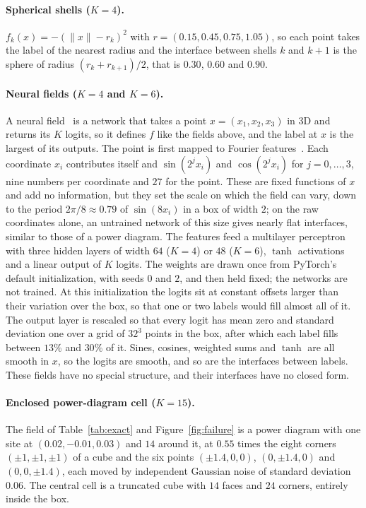 \documentclass[11pt]{article}
\theoremstyle{definition}
\begin{document}
\paragraph{Spherical shells ($K=4$).} $f_k(x) = -(\lVert x\rVert - r_k)^2$ with
$r = (0.15, 0.45, 0.75, 1.05)$, so each point takes the label of the nearest
radius and the interface between shells $k$ and $k+1$ is the sphere of radius
$(r_k + r_{k+1})/2$, that is $0.30$, $0.60$ and $0.90$.

\paragraph{Neural fields ($K=4$ and $K=6$).} A neural
field~\cite{xie2022} is a network that
takes a point ${x = (x_1, x_2, x_3)}$ in 3D and returns its $K$ logits, so it defines $f$ like the
fields above, and the label at $x$ is the largest of its outputs. The point
is first mapped to Fourier features~\cite{tancik2020}. Each coordinate $x_i$ contributes itself
and $\sin(2^j x_i)$ and $\cos(2^j x_i)$ for $j = 0,\dots,3$, nine numbers per
coordinate and $27$ for the point. These are fixed functions of $x$ and add
no information, but they set the scale on which the field can vary, down to
the period $2\pi/8 \approx 0.79$ of $\sin(8 x_i)$ in a box of width $2$; on
the raw coordinates alone, an untrained network of this size gives nearly flat
interfaces, similar to those of a power diagram. The features feed a
multilayer perceptron with three hidden
layers of width $64$ ($K=4$) or $48$ ($K=6$), $\tanh$ activations and a
linear output of $K$ logits. The weights are drawn once from PyTorch's default
initialization, with seeds $0$ and $2$, and then held fixed; the networks are
not trained. At this initialization the logits sit at constant offsets larger
than their variation over the box, so that one or two labels would fill
almost all of it. The output layer is rescaled so that every logit
has mean zero and standard deviation one over a grid of $32^3$ points in the
box, after which each label fills between $13\%$ and $30\%$ of it. Sines,
cosines, weighted sums and $\tanh$ are all smooth in $x$, so the logits are
smooth, and so are the interfaces between labels. These fields have no
special structure, and their interfaces have no closed form.

\paragraph{Enclosed power-diagram cell ($K=15$).} The field of
Table~\ref{tab:exact} and Figure~\ref{fig:failure} is a power diagram with one
site at $(0.02, -0.01, 0.03)$ and $14$ around it, at $0.55$ times the eight
corners $(\pm1, \pm1, \pm1)$ of a cube and the six points $(\pm1.4, 0, 0)$,
$(0, \pm1.4, 0)$ and $(0, 0, \pm1.4)$, each moved by independent Gaussian
noise of standard deviation $0.06$. The central cell is a truncated cube with
$14$ faces and $24$ corners, entirely inside the box.
\end{document}
